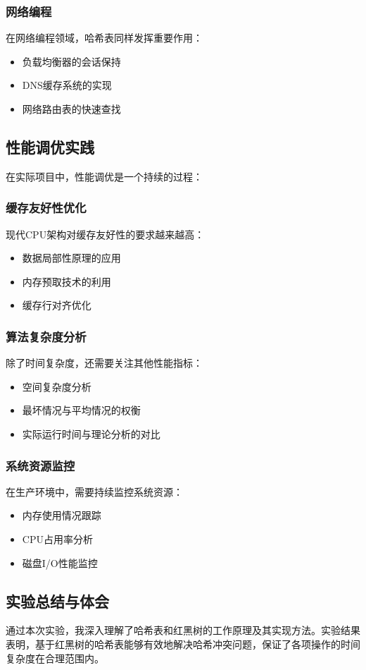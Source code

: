 \documentclass[12pt,a4paper]{article}
\begin{document}
\subsubsection{网络编程}
在网络编程领域，哈希表同样发挥重要作用：
\begin{itemize}
\item 负载均衡器的会话保持
\item DNS缓存系统的实现
\item 网络路由表的快速查找
\end{itemize}

\subsection{性能调优实践}
在实际项目中，性能调优是一个持续的过程：

\subsubsection{缓存友好性优化}
现代CPU架构对缓存友好性的要求越来越高：
\begin{itemize}
\item 数据局部性原理的应用
\item 内存预取技术的利用
\item 缓存行对齐优化
\end{itemize}

\subsubsection{算法复杂度分析}
除了时间复杂度，还需要关注其他性能指标：
\begin{itemize}
\item 空间复杂度分析
\item 最坏情况与平均情况的权衡
\item 实际运行时间与理论分析的对比
\end{itemize}

\subsubsection{系统资源监控}
在生产环境中，需要持续监控系统资源：
\begin{itemize}
\item 内存使用情况跟踪
\item CPU占用率分析
\item 磁盘I/O性能监控
\end{itemize}

\subsection{实验总结与体会}
通过本次实验，我深入理解了哈希表和红黑树的工作原理及其实现方法。实验结果表明，基于红黑树的哈希表能够有效地解决哈希冲突问题，保证了各项操作的时间复杂度在合理范围内。
\end{document}

